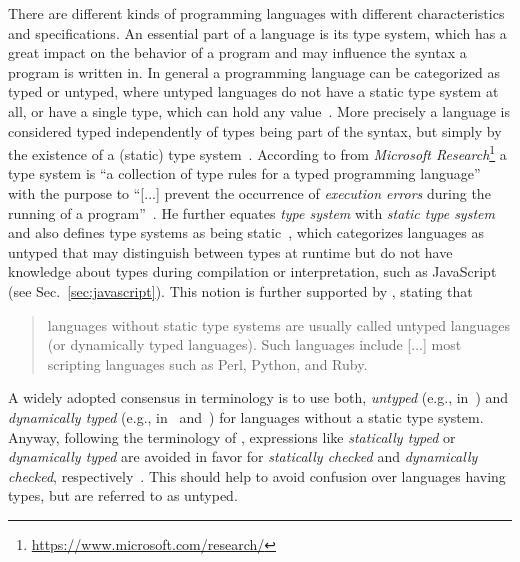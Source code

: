 There are different kinds of programming languages with different characteristics and specifications. An essential part of a language is its type system, which has a great impact on the behavior of a program and may influence the syntax a program is written in.
In general a programming language can be categorized as typed or untyped, where untyped languages do not have a static type system at all, or have a single type, which can hold any value~\cite[p.~97-2]{TypeSystems:Cardelli:2004}. More precisely a language is considered typed independently of types being part of the syntax, but simply by the existence of a (static) type system~\cite[p.~97-2]{TypeSystems:Cardelli:2004}.
According to \citeauthor{TypeSystems:Cardelli:2004} from \emph{Microsoft Research}\footnote{\url{https://www.microsoft.com/research/}} a type system is ``a collection of type rules for a typed programming language''~\cite[p.~97-38]{TypeSystems:Cardelli:2004} with the purpose to ``[...] prevent the occurrence of \emph{execution errors} during the running of a program''~\cite[p.~97-1]{TypeSystems:Cardelli:2004}.
He further equates \emph{type system} with \emph{static type system} and also \citeauthor{TypesAndProgrammingLanguages:Pierce:2002} defines type systems as being static~\cite[p.~2]{TypesAndProgrammingLanguages:Pierce:2002}, which categorizes languages as untyped that may distinguish between types at runtime but do not have knowledge about types during compilation or interpretation, such as JavaScript (see Sec.~\ref{sec:javascript}). This notion is further supported by \citeauthor{ProgrammingLanguagesPrinciplesAndPractices:LoudenLambert:2011}, stating that
\begin{quote}
  languages without static type systems are usually called untyped languages (or dynamically typed languages). Such languages include [...] most scripting languages such as Perl, Python, and Ruby.~\cite[p.~331]{ProgrammingLanguagesPrinciplesAndPractices:LoudenLambert:2011}
\end{quote}
A widely adopted consensus in terminology is to use both, \emph{untyped} (e.g., in~\cite[p.~117]{LogicalTypesForUntypedLanguages:Tobin-Hochstadt:2010}) and \emph{dynamically typed} (e.g., in~\cite[p.~32]{TowardsAProgramLogicForJavaScript:Gardner:2012} and~\cite[p.~203]{TypeSystemsDirectedProgrammingLanguageEvolution:Nino:2012}) for languages without a static type system. Anyway, following the terminology of \citeauthor{TypeSystems:Cardelli:2004}, expressions like
\emph{statically typed} or \emph{dynamically typed} are avoided in favor for \emph{statically checked} and \emph{dynamically checked}, respectively~\cite[p.~97-1]{TypeSystems:Cardelli:2004}. This should help to avoid confusion over languages having types, but are referred to as untyped.

